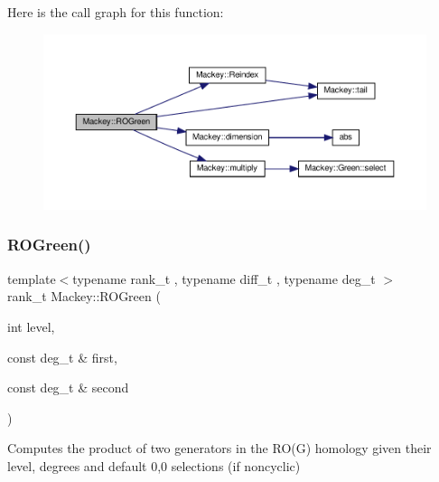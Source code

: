Here is the call graph for this function\+:\nopagebreak
\begin{figure}[H]
\begin{center}
\leavevmode
\includegraphics[width=350pt]{namespaceMackey_a2bd86833844ca62d76c47a54aeb0bb77_cgraph}
\end{center}
\end{figure}
\mbox{\label{namespaceMackey_a07d3b1e748c6cf2fd8a6e21b948a0afe}} 
\subsubsection{\texorpdfstring{R\+O\+Green()}{ROGreen()}\hspace{0.1cm}{\footnotesize\ttfamily [2/2]}}
{\footnotesize\ttfamily template$<$typename rank\+\_\+t , typename diff\+\_\+t , typename deg\+\_\+t $>$ \\
rank\+\_\+t Mackey\+::\+R\+O\+Green (\begin{DoxyParamCaption}\item[{int}]{level,  }\item[{const deg\+\_\+t \&}]{first,  }\item[{const deg\+\_\+t \&}]{second }\end{DoxyParamCaption})\hspace{0.3cm}{\ttfamily [inline]}}



Computes the product of two generators in the R\+O(\+G) homology given their level, degrees and default 0,0 selections (if noncyclic) 

\mbox{\label{namespaceMackey_a58708ee937b0c4172b7cde8e5f856504}} 
